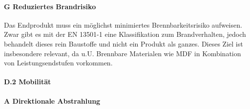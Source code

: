 \paragraph{G Reduziertes Brandrisiko} Das Endprodukt muss ein möglichst minimiertes Brennbarkeitsrisiko aufweisen. Zwar gibt es mit der EN 13501-1 eine Klassifikation zum Brandverhalten, jedoch behandelt dieses rein Baustoffe und nicht ein Produkt als ganzes. Dieses Ziel ist insbesondere relevant, da u.U. Brennbare Materialen wie MDF in Kombination von Leistungsendstufen vorkommen.
\paragraph{D.2 Mobilität}
\paragraph{A Direktionale Abstrahlung}